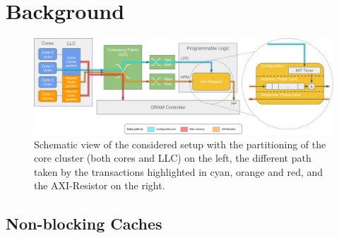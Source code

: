 \section{Background}
    \begin{figure}
        \centering
        \includegraphics[scale=0.56]{images/Evaluation_setup.pdf}
        \caption{Schematic view of the considered setup with the partitioning of the core cluster (both cores and LLC) on the left, the different path taken by the transactions highlighted in cyan, orange and red, and the AXI-Resistor on the right.}
        \label{fig:system_schematic}
    \end{figure}
    \subsection{Non-blocking Caches}
%

